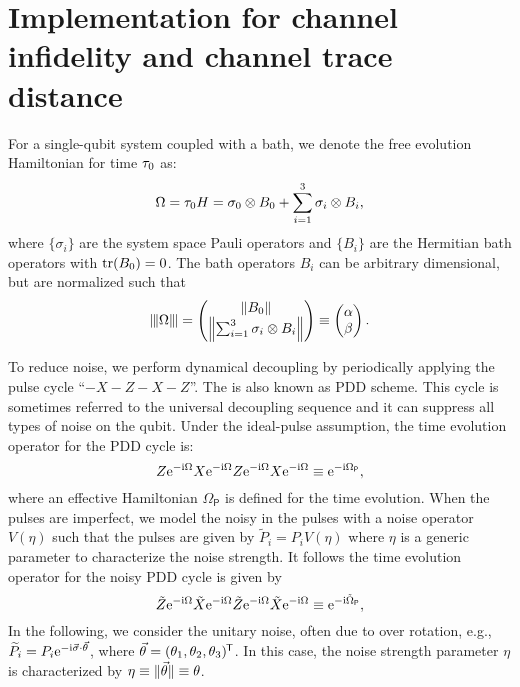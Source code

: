 \documentclass[aps,pra,reprint,superscriptaddress]{revtex4-2}
\newcommand{\Opdd}{\Omega_{\mathsf{P}}}
\begin{document}
\section{Implementation for channel infidelity and channel trace distance}\label{app:fidelity-numerics}
For a single-qubit system coupled with a bath, we denote the free evolution Hamiltonian for time $\tau_0$ as:
\begin{equation}\label{eq:omega-sq}
    \Omega = \tau_0 H = \sigma_0 \otimes B_0 + \sum_{i=1}^3 \sigma_i \otimes B_i,
\end{equation}
where 
$\{\sigma_i\}$ are the system space Pauli operators and
$\{B_i\}$ are the Hermitian bath operators with $\operatorname{tr}(B_0)=0$. The bath operators $B_i$ can be arbitrary dimensional, but are normalized such that  
\begin{equation}\label{eq:bathops-norm}
\opnorm{\Omega}
=
\begin{pmatrix}
\norm{B_0}\\
\norm[\Big]{\sum_{i=1}^3 \sigma_i \otimes B_i}
\end{pmatrix}\equiv\begin{pmatrix}
    \alpha\\
    \beta
    \end{pmatrix}.
\end{equation}

 

To reduce noise, we perform dynamical decoupling by periodically
applying the pulse cycle ``$-X-Z-X-Z$''.
The is also known as PDD scheme.
This cycle is sometimes referred to the universal decoupling sequence and it can suppress all types of noise on the qubit. 
Under the ideal-pulse assumption, the time evolution operator for the PDD cycle is:
\begin{equation}
Z \upe^{-\upi \Omega} X \upe^{-\upi \Omega} Z \upe^{-\upi \Omega} X \upe^{-\upi \Omega} 
\equiv \upe^{-\upi\Opdd},
\end{equation}
where an effective Hamiltonian $\Opdd$ is defined for the time evolution. When the pulses are imperfect, we model the noisy in the pulses with a noise operator $V(\eta)$ such that the pulses are given by $\tilde{P}_i = P_iV(\eta)$ where $\eta$ is a generic parameter to characterize the noise strength. It follows the time evolution operator for the noisy PDD cycle is given by
\begin{equation}
    \tilde{Z} \mathrm{e}^{-\mathrm{i} \Omega} \tilde{X}  \mathrm{e}^{-\mathrm{i} \Omega} \tilde{Z} \mathrm{e}^{-\mathrm{i} \Omega} \tilde{X} \mathrm{e}^{-\mathrm{i} \Omega} 
    \equiv \mathrm{e}^{-\mathrm{i}\tilde{\Omega}_{\mathsf{P}}},
\end{equation}
In the following, we consider the unitary noise, often due to over rotation, e.g., $\widetilde{P}_i = P_i \mathrm{e}^{-\mathrm{i} \vec{\sigma} \cdot\vec{\theta}}$, where $\vec{\theta} = (\theta_1,\theta_2, \theta_3)^{\mkern-1.5mu\mathsf{T}}$. In this case, the noise strength parameter $\eta$ is characterized by $\eta\equiv\Vert {\vec{\theta}} \Vert\equiv\theta$.
\end{document}
